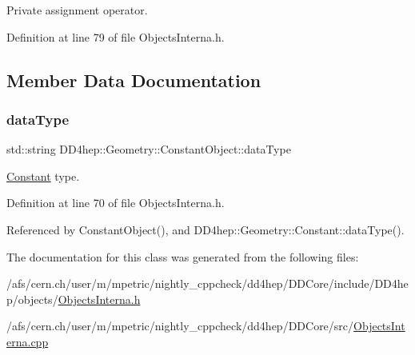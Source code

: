 Private assignment operator. 



Definition at line 79 of file Objects\+Interna.\+h.



\subsection{Member Data Documentation}
\hypertarget{class_d_d4hep_1_1_geometry_1_1_constant_object_afa7868ea6bab516b7cd63ac1c9537e5c}{}\label{class_d_d4hep_1_1_geometry_1_1_constant_object_afa7868ea6bab516b7cd63ac1c9537e5c} 
\subsubsection{\texorpdfstring{data\+Type}{dataType}}
{\footnotesize\ttfamily std\+::string D\+D4hep\+::\+Geometry\+::\+Constant\+Object\+::data\+Type}



\hyperlink{class_d_d4hep_1_1_geometry_1_1_constant}{Constant} type. 



Definition at line 70 of file Objects\+Interna.\+h.



Referenced by Constant\+Object(), and D\+D4hep\+::\+Geometry\+::\+Constant\+::data\+Type().



The documentation for this class was generated from the following files\+:\begin{DoxyCompactItemize}
\item 
/afs/cern.\+ch/user/m/mpetric/nightly\+\_\+cppcheck/dd4hep/\+D\+D\+Core/include/\+D\+D4hep/objects/\hyperlink{_objects_interna_8h}{Objects\+Interna.\+h}\item 
/afs/cern.\+ch/user/m/mpetric/nightly\+\_\+cppcheck/dd4hep/\+D\+D\+Core/src/\hyperlink{_objects_interna_8cpp}{Objects\+Interna.\+cpp}\end{DoxyCompactItemize}
